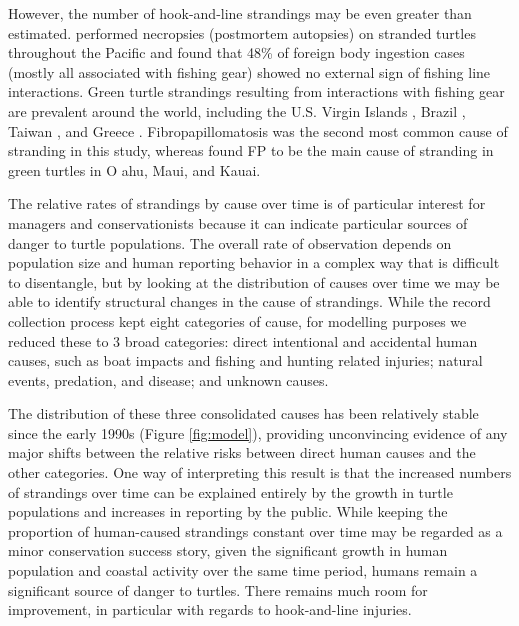 \documentclass[sn-basic,NameDate]{sn-jnl}\usepackage[]{graphicx}\usepackage[]{xcolor}
\DeclareRobustCommand{\okina}{%
  \raisebox{\dimexpr\fontcharht\font`A-\height}{%
    \scalebox{0.8}{`}%
  }%
}
\newcommand{\Oahu}{O\okina ahu}
\begin{document}
However, the number of hook-and-line strandings may be even greater than estimated. 
\cite{work2015causes} performed necropsies (postmortem autopsies) on stranded turtles throughout the Pacific and found that 48\% of foreign body ingestion cases (mostly all associated with fishing gear) showed no external sign of fishing line interactions.
Green turtle strandings resulting from interactions with fishing gear are prevalent around the world, including the U.S. Virgin Islands \citep{boulon2000trends}, Brazil \citep{guimares2021distribution}, Taiwan \citep{cheng2019twenty}, and Greece \citep{panagopoulos2003stranding}. 
Fibropapillomatosis was the second most common cause of stranding in this study, whereas \cite{chaloupka2008cause} found FP to be the main cause of stranding in green turtles in \Oahu, Maui, and Kauai. 

The relative rates of strandings by cause over time is of particular interest for managers and conservationists because it can indicate particular sources of danger to turtle populations. 
The overall rate of observation depends on population size and human reporting behavior in a complex way that is difficult to disentangle, but by looking at the distribution of causes over time we may be able to identify structural changes in the cause of strandings.
While the record collection process kept eight categories of cause, for modelling purposes we reduced these to 3 broad categories: direct intentional and accidental human causes, such as boat impacts and fishing and hunting related injuries; natural events, predation, and disease; and unknown causes. 

The distribution of these three consolidated causes has been relatively stable since the early 1990s (Figure \ref{fig:model}), providing unconvincing evidence of any major shifts between the relative risks between direct human causes and the other categories.
One way of interpreting this result is that the increased numbers of strandings over time can be explained entirely by the growth in turtle populations and increases in reporting by the public. 
While keeping the proportion of human-caused strandings constant over time may be regarded as a minor conservation success story, given the significant growth in human population and coastal activity over the same time period, humans remain a significant source of danger to turtles.
There remains much room for improvement, in particular with regards to hook-and-line injuries.
\end{document}
